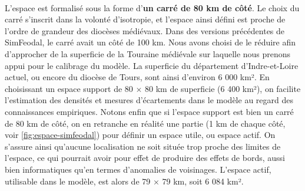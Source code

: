 \paragraph[Dimension]{}L'espace est formalisé sous la forme d'\textbf{un carré de 80 km de côté}.
Le choix du carré s'inscrit dans la volonté d'isotropie, et l'espace ainsi défini est proche de l'ordre de grandeur des diocèses médiévaux.
Dans des versions précédentes de SimFeodal, le carré avait un côté de 100 km. Nous avons choisi de le réduire afin d'approcher de la superficie de la Touraine médiévale sur laquelle nous prenons appui pour le calibrage du modèle. 
La superficie du département d'Indre-et-Loire actuel, ou encore du diocèse de Tours, sont ainsi d'environ 6 000 km².
En choisissant un espace support de 80 $\times$ 80 km de superficie (6 400 km²), on facilite l'estimation des densités et mesures d'écartements dans le modèle au regard des connaissances empiriques.
Notons enfin que si l'espace support est bien un carré de 80 km de côté, on en retranche en réalité une partie (1 km de chaque côté, voir \cref{fig:espace-simfeodal}) pour définir un espace utile, ou \og espace actif\fg{}.
On s'assure ainsi qu'aucune localisation ne soit située trop proche des limites de l'espace, ce qui pourrait avoir pour effet de produire des \og effets de bords\fg{}, aussi bien informatiques qu'en termes d'anomalies de voisinages.
L'espace actif, utilisable dans le modèle, est alors de 79 $\times$ 79 km, soit 6 084 km².



